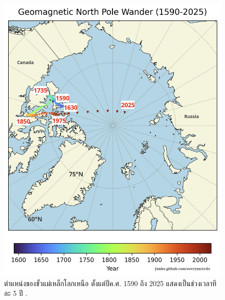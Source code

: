 \documentclass[10pt,twocolumn,letterpaper]{article}
\begin{document}
\begin{figure}[t]
\begin{center}
   \includegraphics[width=1\linewidth]{npw.jpg}
\end{center}

\caption{ตำแหน่งของขั้วแม่เหล็กโลกเหนือ ตั้งแต่ปีค.ศ. 1590 ถึง 2025 แสดงเป็นช่วงเวลาทีละ 5 ปี \cite{142}.}
\label{fig:13}
\label{fig:onecol}
\end{figure}
\end{document}
